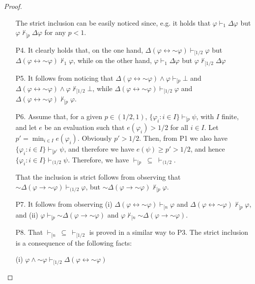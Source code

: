 \documentclass{article}
\theoremstyle{definition}
\newcommand{\ninv}{\mathord{\sim}}
\begin{document}
\begin{proof}
\begin{enumerate}
The strict inclusion can be easily noticed since, e.g. it holds that  $\varphi \vdash_1 \Delta \varphi$ but $\varphi \nvdash_{[p} \Delta \varphi$ for any $p < 1$.


\item[P4.] It clearly holds that, on the one hand, $\Delta(\varphi \leftrightarrow \ninv \varphi) \vdash_{[1/2} \varphi$ but $\Delta(\varphi \leftrightarrow \ninv \varphi) \nvdash_{1} \varphi$, while on the other hand,
$\varphi \vdash_1 \Delta \varphi$ but $\varphi \nvdash_{[1/2} \Delta \varphi$

\item[P5.]  It follows from noticing that $\Delta(\varphi \leftrightarrow \ninv \varphi) \land \varphi \vdash_{[p} \bot$ and $\Delta(\varphi \leftrightarrow \ninv \varphi) \land \varphi \nvdash_{[1/2} \bot$, while
$\Delta(\varphi \leftrightarrow \ninv \varphi) \vdash_{[1/2} \varphi$ and $\Delta(\varphi \leftrightarrow \ninv \varphi) \nvdash_{[p} \varphi$.

\item[P6.]
Assume that, for a given $p  \in (1/2,1)$, $\{\varphi_i :  i \in I\} \vdash_{[p} \psi$, with $I$ finite, and let $e$ be an evaluation such that $e(\varphi_i) > 1/2 $ for all $i \in I$. 
Let $p' = \min_{i \in I} e(\varphi_i)$. Obviously $p' > 1/2$. Then, from P1 we also have $\{\varphi_i :  i \in I\} \vdash_{[p'} \psi$, and therefore we have $e(\psi) \geq p' > 1/2$, and hence $\{\varphi_i :  i \in I\} \vdash_{(1/2} \psi$. Therefore, we have $\vdash_{[p}  \; \subseteq  \; \vdash_{(1/2}$.

That the inclusion is strict follows from observing that $\ninv \Delta (\varphi \to \ninv \varphi) \vdash_{(1/2} \varphi$, but $ \ninv \Delta (\varphi \to \ninv \varphi) \nvdash_{[p} \varphi$.

\item[P7.]  It follows from observing (i) $\Delta(\varphi \leftrightarrow \ninv \varphi) \vdash_{[n} \varphi$ and $\Delta(\varphi \leftrightarrow \ninv \varphi) \nvdash_{[p} \varphi$, and  (ii)
$ \varphi \vdash_{[p} \ninv \Delta (\varphi \to  \ninv \varphi)$ and $\varphi \nvdash_{[n} \ninv \Delta (\varphi \to \ninv \varphi)$.

\item[P8.]  That $\vdash_{[n} ~\subseteq ~\vdash_{[1/2}$  is proved in a similar way to P3. The strict inclusion is a consequence of the following facts:

(i) $\varphi \land \ninv \varphi \vdash_{[1/2} \Delta(\varphi \leftrightarrow \ninv \varphi)$


\end{enumerate}
\end{proof}
\end{document}
